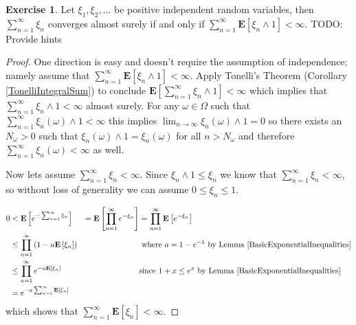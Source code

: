 \documentclass{amsbook}
\theoremstyle{definition}
\newtheorem{xca}{Exercise}
\theoremstyle{remark}
\newcommand{\expectation}[1]{\textbf{E}\left[#1\right]}
\begin{document}
\begin{xca}Let $\xi_1, \xi_2, \dots$ be positive independent random
  variables, then $\sum_{n=1}^\infty \xi_n$ converges almost surely if
  and only if $\sum_{n=1}^\infty \expectation{\xi_n \wedge 1} <
  \infty$.
TODO: Provide hints
\end{xca}
\begin{proof}One direction is easy and doesn't require the assumption
  of independence; namely assume that $\sum_{n=1}^\infty
  \expectation{\xi_n \wedge 1} < \infty$.
Apply Tonelli's Theorem (Corollary \ref{TonelliIntegralSum}) to
conclude $\expectation{\sum_{n=1}^\infty \xi_n \wedge 1} < \infty $
which implies that $\sum_{n=1}^\infty \xi_n \wedge 1 < \infty$ almost
surely.  For any $\omega \in \Omega$ such that $\sum_{n=1}^\infty
\xi_n(\omega) \wedge 1 < \infty$ this implies $\lim_{n \to \infty}
\xi_n(\omega) \wedge 1 = 0$ so there exists an $N_\omega > 0$ such
that $\xi_n(\omega) \wedge 1 = \xi_n(\omega)$  for all $n>N_\omega$ 
and therefore $\sum_{n=1}^\infty\xi_n(\omega) < \infty$ as
well.

Now lets assume $\sum_{n=1}^\infty \xi_n < \infty$.  Since $\xi_n
\wedge 1 \leq \xi_n$ we know that $\sum_{n=1}^\infty \xi_n < \infty$, 
so without loss of generality we
can assume $0 \leq \xi_n \leq 1$.

\begin{align*}
0 &< \expectation{e^{-\sum_{n=1}^\infty \xi_n}} 
&=\expectation{\prod_{n=1}^\infty e^{-\xi_n}} 
&= \prod_{n=1}^\infty \expectation{ e^{-\xi_n}} \\
&\leq \prod_{n=1}^\infty \left ( 1 - a\expectation{\xi_n} \right ) &
&\text{ where $a=1-e^{-1}$ by Lemma
  \ref{BasicExponentialInequalities}} \\
&\leq \prod_{n=1}^\infty e^{- a\expectation{\xi_n} } & & \text{since
  $1+x\leq e^x$ by Lemma \ref{BasicExponentialInequalities}} \\
&= e^{-a \sum_{n=1}^\infty \expectation{\xi_n} }
\end{align*}
which shows that $\sum_{n=1}^\infty \expectation{\xi_n} < \infty$.
\end{proof}
\end{document}
